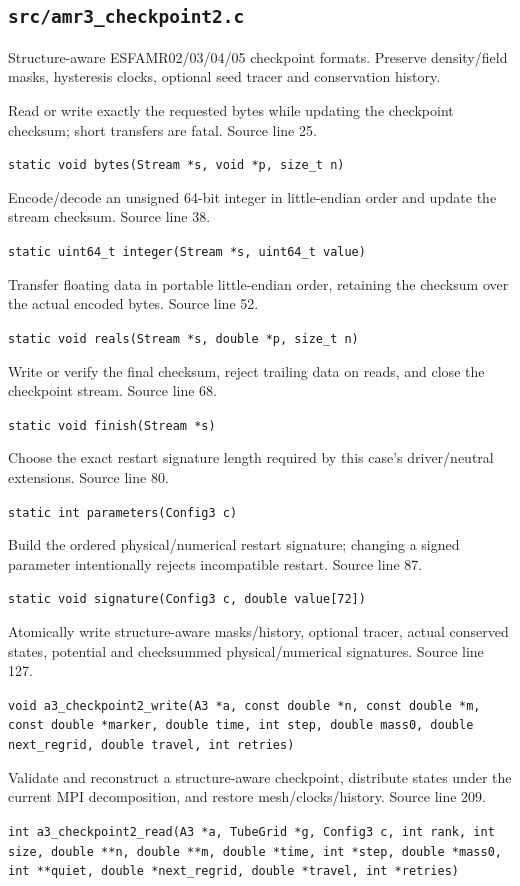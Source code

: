 \subsection{\texttt{src/amr3\_checkpoint2.c}}
Structure-aware ESFAMR02/03/04/05 checkpoint formats. Preserve density/field masks, hysteresis clocks, optional seed tracer and conservation history.
\begin{description}[style=nextline,leftmargin=0pt,labelindent=0pt,labelwidth=0pt,labelsep=0pt]
\item[\texttt{bytes}] Read or write exactly the requested bytes while updating the checkpoint checksum; short transfers are fatal. Source line 25.\par
{\small\nolinkurl{static void bytes(Stream *s, void *p, size_t n)}}
\item[\texttt{integer}] Encode/decode an unsigned 64-bit integer in little-endian order and update the stream checksum. Source line 38.\par
{\small\nolinkurl{static uint64_t integer(Stream *s, uint64_t value)}}
\item[\texttt{reals}] Transfer floating data in portable little-endian order, retaining the checksum over the actual encoded bytes. Source line 52.\par
{\small\nolinkurl{static void reals(Stream *s, double *p, size_t n)}}
\item[\texttt{finish}] Write or verify the final checksum, reject trailing data on reads, and close the checkpoint stream. Source line 68.\par
{\small\nolinkurl{static void finish(Stream *s)}}
\item[\texttt{parameters}] Choose the exact restart signature length required by this case's driver/neutral extensions. Source line 80.\par
{\small\nolinkurl{static int parameters(Config3 c)}}
\item[\texttt{signature}] Build the ordered physical/numerical restart signature; changing a signed parameter intentionally rejects incompatible restart. Source line 87.\par
{\small\nolinkurl{static void signature(Config3 c, double value[72])}}
\item[\texttt{a3\_checkpoint2\_write}] Atomically write structure-aware masks/history, optional tracer, actual conserved states, potential and checksummed physical/numerical signatures. Source line 127.\par
{\small\nolinkurl{void a3_checkpoint2_write(A3 *a, const double *n, const double *m, const double *marker, double time, int step, double mass0, double next_regrid, double travel, int retries)}}
\item[\texttt{a3\_checkpoint2\_read}] Validate and reconstruct a structure-aware checkpoint, distribute states under the current MPI decomposition, and restore mesh/clocks/history. Source line 209.\par
{\small\nolinkurl{int a3_checkpoint2_read(A3 *a, TubeGrid *g, Config3 c, int rank, int size, double **n, double **m, double *time, int *step, double *mass0, int **quiet, double *next_regrid, double *travel, int *retries)}}
\end{description}
